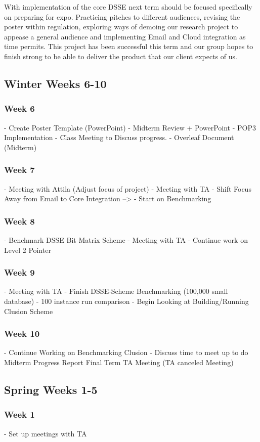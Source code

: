 With implementation of the core DSSE next term should be focused specifically on preparing for expo. Practicing pitches to different audiences, revising the poster within regulation, exploring ways of demoing our research project to appease a general audience and implementing Email and Cloud integration as time permits. This project has been successful this term and our group hopes to finish strong to be able to deliver the product that our client expects of us.

\subsection{Winter Weeks 6-10}
\subsubsection {Week 6}
- Create Poster Template (PowerPoint)
- Midterm Review + PowerPoint
- POP3 Implementation
- Class Meeting to Discuss progress.
- Overleaf Document (Midterm)

\subsubsection {Week 7}
- Meeting with Attila (Adjust focus of project)
- Meeting with TA
- Shift Focus Away from Email to Core Integration --> 
- Start on Benchmarking
\subsubsection {Week 8}
- Benchmark DSSE Bit Matrix Scheme
- Meeting with TA
- Continue work on Level 2 Pointer
\subsubsection {Week 9}
- Meeting with TA
- Finish DSSE-Scheme Benchmarking (100,000 small database)
- 100 instance run comparison
- Begin Looking at Building/Running Clusion Scheme
\subsubsection {Week 10}
- Continue Working on Benchmarking Clusion
- Discuss time to meet up to do Midterm Progress Report
Final Term TA Meeting (TA canceled Meeting)
\subsection {Spring Weeks 1-5}

\subsubsection{Week 1}
- Set up meetings with TA


